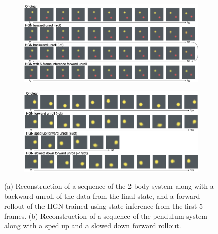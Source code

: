 \begin{figure}
    \centering
    \begin{subfigure}{.48\textwidth}
        \centering
        \includegraphics[width=.9\linewidth]{../openreview/pictures/rollout_samples/new_forward_unroll_2_body.png}
        \label{fig:rollout-3-body}
        \caption{}
    \end{subfigure}
    \begin{subfigure}{.48\textwidth}
        \centering
        \includegraphics[width=.9\linewidth]{../openreview/pictures/rollout_samples/new_forward_backward_unroll_pendulum.png}
        \caption{}
        \label{fig:rollout-pendulum}
    \end{subfigure}
    \caption{(a) Reconstruction of a sequence of the 2-body system along with a backward unroll of the data from the final state, and a forward rollout of the HGN trained using state inference from the first 5 frames. (b) Reconstruction of a sequence of the pendulum system along with a sped up and a slowed down forward rollout.}
    \label{fig:rollout_back_forth}
\end{figure}

